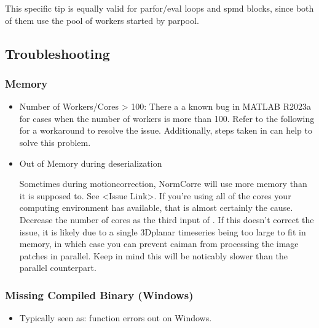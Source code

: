 \documentclass[letterpaper,10pt,english]{sphinxmanual}
\begin{document}
\sphinxAtStartPar
This specific tip is equally valid for parfor/eval loops and spmd blocks, since both of them use the pool of workers started by parpool.

\sphinxstepscope


\subsection{Troubleshooting}
\label{\detokenize{user_guide/troubleshooting:troubleshooting}}\label{\detokenize{user_guide/troubleshooting::doc}}

\subsubsection{Memory}
\label{\detokenize{user_guide/troubleshooting:memory}}\begin{itemize}
\item {} 
\sphinxAtStartPar
Number of Workers/Cores \textgreater{} 100: There a a known bug in MATLAB R2023a for cases when the number of workers is more than 100.
Refer to the following  for a workaround to resolve the issue. Additionally, steps taken in {\hyperref[\detokenize{user_guide/troubleshooting:matlab-server-issues}]{}} can help to solve this problem.

\item {} 
\sphinxAtStartPar
Out of Memory during deserialization

\sphinxAtStartPar
Sometimes during motion\sphinxhyphen{}correction, NormCorre will use more memory than it is supposed to. See \textless{}Issue Link\textgreater{}.
If you’re using all of the cores your computing environment has available, that is almost certainly the cause. Decrease
the number of cores as the third input of {\hyperref[\detokenize{api/core:motionCorrectPlane}]{}}. If this doesn’t correct the issue, it is likely due to
a single 3D\sphinxhyphen{}planar time\sphinxhyphen{}series being too large to fit in memory, in which case you can prevent caiman from processing the image patches
in parallel. Keep in mind this will be noticably slower than the parallel counterpart.

\end{itemize}


\subsubsection{Missing Compiled Binary (Windows)}
\label{\detokenize{user_guide/troubleshooting:missing-compiled-binary-windows}}\begin{itemize}
\item {} 
\sphinxAtStartPar
Typically seen as:  function errors out on Windows.

\end{itemize}
\end{document}
